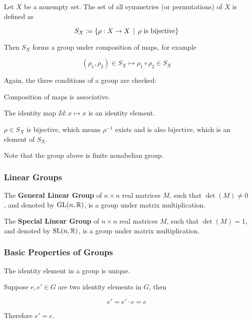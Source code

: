 \documentclass[a4paper,12pt]{article}
\begin{document}
\begin{exm}
  Let $X$ be a nonempty set. The set of all symmetries (or permutations) of $X$ is defined as

  $$S_{X}:=\left\{ \rho:X\rightarrow X\,\mid\,\rho\text{ is bijective}\right\}$$\s

  Then $S_{X}$ forms a group under composition of maps, for example

  $$(\rho_{1},\rho_{2})\in S_{X}\mapsto \rho_{1}\circ\rho_{2}\in S_{X}$$\s

  \prf[zb] Again, the three conditions of a group are checked:

  \begin{alist}
    \item Composition of maps is associative.
    \item The identity map $Id:x\mapsto x$ is an identity element.
    \item $\rho\in S_{X}$ is bijective, which means $\rho^{-1}$ exists and is also bijective, which is an element of $S_{X}$.
  \end{alist}

  Note that the group above is finite nonabelian group.
\end{exm}

\propdisp

\subsubsection{Linear Groups}
\begin{dft}
  The \textbf{General Linear Group} of $n\times n$ real matrices $M$, such that $\det(M)\neq 0$, and denoted by $\mathrm{GL}(n,\mathbb{R})$, is a group under matrix multiplication.
\end{dft}\n

\begin{dft}
  The \textbf{Special Linear Group} of $n\times n$ real matrices $M$, such that $\det(M)=1$, and denoted by $\mathrm{SL}(n,\mathbb{R})$, is a group under matrix multiplication.
\end{dft}

\subsubsection{Basic Properties of Groups}
\begin{pst}
  The identity element in a group is unique.\n

  \prf Suppose $e,e'\in G$ are two identity elements in $G$, then

  $$e'=e'\cdot e=e$$

  Therefore $e'=e$.
\end{pst}\n
\end{document}
